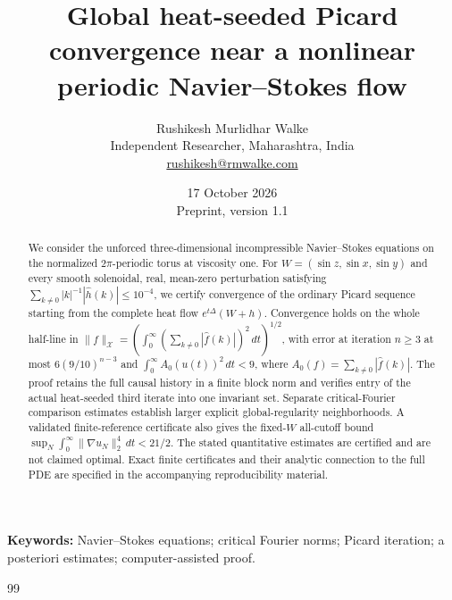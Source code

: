 \documentclass[11pt,a4paper]{article}
\title{Global heat-seeded Picard convergence near a nonlinear periodic Navier--Stokes flow}
\author{Rushikesh Murlidhar Walke\\[3pt]
\small Independent Researcher, Maharashtra, India\\
\small\href{mailto:rushikesh@rmwalke.com}{rushikesh@rmwalke.com}}
\date{17 October 2026\\[4pt]\small Preprint, version 1.1}
\theoremstyle{definition}
\theoremstyle{remark}
\begin{document}
\maketitle
\begin{abstract}
We consider the unforced three-dimensional incompressible Navier--Stokes
equations on the normalized $2\pi$-periodic torus at viscosity one.
For $W=(\sin z,\sin x,\sin y)$ and every smooth solenoidal, real,
mean-zero perturbation satisfying
$\sum_{k\ne0}|k|^{-1}|\widehat h(k)|\le10^{-4}$, we certify convergence
of the ordinary Picard sequence starting from the complete heat flow
$e^{t\Delta}(W+h)$. Convergence holds on the whole half-line in
$\|f\|_{\mathcal X}=(\int_0^\infty(\sum_{k\ne0}|\widehat f(k)|)^2\,dt)^{1/2}$, with error at iteration $n\ge3$
at most $6(9/10)^{n-3}$ and $\int_0^\infty A_0(u(t))^2\,dt<9$,
where $A_0(f)=\sum_{k\ne0}|\widehat f(k)|$.
The proof retains the full causal history in a finite block norm and verifies
entry of the actual heat-seeded third iterate into one invariant set.
Separate critical-Fourier comparison estimates establish larger explicit
global-regularity neighborhoods. A validated finite-reference certificate
also gives the fixed-$W$ all-cutoff bound
$\sup_N\int_0^\infty\|\nabla u_N\|_2^4\,dt<21/2$.
The stated quantitative estimates are certified and are not claimed optimal.
Exact finite certificates and their analytic connection to the full PDE
are specified in the accompanying reproducibility material.
\end{abstract}
\noindent\textbf{Keywords:} Navier--Stokes equations; critical Fourier norms;
Picard iteration; a posteriori estimates; computer-assisted proof.





\appendix

\begin{thebibliography}{99}

\end{thebibliography}
\end{document}
